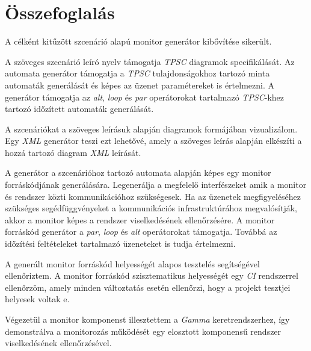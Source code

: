 \chapter{Összefoglalás}

A célként kitűzött szcenárió alapú monitor generátor kibővítése sikerült.

A szöveges szcenárió leíró nyelv támogatja \textit{TPSC} diagramok specifikálását.
Az automata generátor támogatja a \textit{TPSC} tulajdonságokhoz tartozó minta automaták generálását és képes az üzenet paramétereket is értelmezni.
A generátor támogatja az \textit{alt}, \textit{loop} és \textit{par} operátorokat tartalmazó \textit{TPSC}-khez tartozó időzített automaták generálását.

A szcenáriókat a szöveges leírásuk alapján diagramok formájában vizualizálom.
Egy \textit{XML} generátor teszi ezt lehetővé, amely a szöveges leírás alapján elkészíti a hozzá tartozó diagram \textit{XML} leírását.

A generátor a szcenárióhoz tartozó automata alapján képes egy monitor forráskódjának generálására.
Legenerálja a megfelelő interfészeket amik a monitor és rendszer közti kommunikációhoz szükségesek.
Ha az üzenetek megfigyeléséhez szükséges segédfüggvényeket a kommunikációs infrastruktúrához megvalósítják, akkor a monitor képes a rendszer viselkedésének ellenőrzésére.
A monitor forráskód generátor a \textit{par}, \textit{loop} és \textit{alt} operátorokat támogatja.
Továbbá az időzítési feltételeket tartalmazó üzeneteket is tudja értelmezni.

A generált monitor forráskód helyességét alapos tesztelés segítségével ellenőriztem.
A monitor forráskód szisztematikus helyességét egy \textit{CI} rendszerrel ellenőrzöm, amely minden változtatás esetén ellenőrzi, hogy a projekt tesztjei helyesek voltak e.

Végezetül a monitor komponenst illesztettem a \textit{Gamma} keretrendszerhez, így demonstrálva a monitorozás működését egy elosztott komponensű rendszer viselkedésének ellenőrzésével.